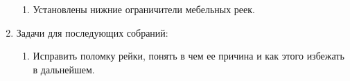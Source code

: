 \begin{enumerate}
\begin{enumerate}
      \item Установлены нижние ограничители мебельных реек.
      
    \end{enumerate}
    
	\item Задачи для последующих собраний:
	\begin{enumerate}
	  \item Исправить поломку рейки, понять в чем ее причина и как этого избежать в дальнейшем.
	  
    \end{enumerate}     
\end{enumerate}
\fillpage
